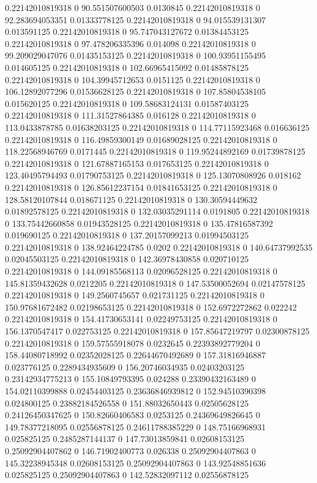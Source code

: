 0.22142010819318 0 90.551507600503 0.0130845
0.22142010819318 0 92.283694053351 0.01333778125
0.22142010819318 0 94.015539131307 0.013591125
0.22142010819318 0 95.747043127672 0.01384453125
0.22142010819318 0 97.478206335396 0.014098
0.22142010819318 0 99.209029047076 0.01435153125
0.22142010819318 0 100.93951155495 0.014605125
0.22142010819318 0 102.66965415092 0.01485878125
0.22142010819318 0 104.39945712653 0.0151125
0.22142010819318 0 106.12892077296 0.01536628125
0.22142010819318 0 107.85804538105 0.015620125
0.22142010819318 0 109.58683124131 0.01587403125
0.22142010819318 0 111.31527864385 0.016128
0.22142010819318 0 113.0433878785 0.01638203125
0.22142010819318 0 114.77115923468 0.016636125
0.22142010819318 0 116.49859300149 0.01689028125
0.22142010819318 0 118.22568946769 0.0171445
0.22142010819318 0 119.95244892169 0.01739878125
0.22142010819318 0 121.67887165153 0.017653125
0.22142010819318 0 123.40495794493 0.01790753125
0.22142010819318 0 125.13070808926 0.018162
0.22142010819318 0 126.85612237154 0.01841653125
0.22142010819318 0 128.58120107844 0.018671125
0.22142010819318 0 130.30594449632 0.01892578125
0.22142010819318 0 132.03035291114 0.0191805
0.22142010819318 0 133.75442660858 0.01943528125
0.22142010819318 0 135.47816587392 0.019690125
0.22142010819318 0 137.20157099213 0.01994503125
0.22142010819318 0 138.92464224785 0.0202
0.22142010819318 0 140.64737992535 0.02045503125
0.22142010819318 0 142.36978430858 0.020710125
0.22142010819318 0 144.09185568113 0.02096528125
0.22142010819318 0 145.81359432628 0.0212205
0.22142010819318 0 147.53500052694 0.02147578125
0.22142010819318 0 149.2560745657 0.021731125
0.22142010819318 0 150.97681672482 0.02198653125
0.22142010819318 0 152.6972272862 0.022242
0.22142010819318 0 154.41730653141 0.02249753125
0.22142010819318 0 156.1370547417 0.022753125
0.22142010819318 0 157.85647219797 0.02300878125
0.22142010819318 0 159.57555918078 0.0232645
0.22393892779204 0 158.44080718992 0.02352028125
0.22644670492689 0 157.31816946887 0.023776125
0.2289434935609 0 156.20746034935 0.02403203125
0.23142934775213 0 155.10849793395 0.024288
0.23390432163489 0 154.02110399888 0.02454403125
0.23636846939812 0 152.94510390398 0.024800125
0.23882184526558 0 151.88032650443 0.02505628125
0.24126450347625 0 150.82660406583 0.0253125
0.24369649826645 0 149.78377218095 0.02556878125
0.24611788385229 0 148.75166968931 0.025825125
0.2485287144137 0 147.73013859841 0.02608153125
0.25092904407862 0 146.71902400773 0.026338
0.25092904407863 0 145.32238945348 0.02608153125
0.25092904407863 0 143.92548851636 0.025825125
0.25092904407863 0 142.52832097112 0.02556878125
